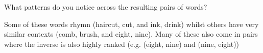 \problem[2]
What patterns do you notice across the resulting pairs of words?
\begin{solution}
 Some of these words rhymn (haircut, cut, and ink, drink) whilst others have very similar contexts (comb, brush, and eight, nine). Many of these also come in pairs where the inverse is also highly ranked (e.g. (eight, nine) and (nine, eight))
\end{solution}



